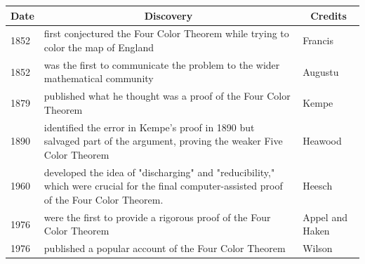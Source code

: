 \documentclass[11pt,a4paper,twoside]{book}
\begin{document}
\vspace{3.8cm}
\begin{table}[h]
	\centering
	\begin{tabular}{|p{2cm}|p{14cm}|p{2cm}|}
		\hline
		\multicolumn{1}{|c|}{Date} & \multicolumn{1}{c}{Discovery} & \multicolumn{1}{|c|}{Credits} \\
		\hline
		1852 &  first conjectured the Four Color Theorem while trying to color the map of England & Francis\\
		\hline
		1852 & was the first to communicate the problem to the wider mathematical community & Augustu \\
		\hline
		1879 & published what he thought was a proof of the Four Color Theorem  & Kempe \\
		\hline
		1890 & identified the error in Kempe's proof in 1890 but salvaged part of the argument, proving the weaker Five Color Theorem & Heawood \\
		\hline
		1960 & developed the idea of "discharging" and "reducibility," which were crucial for the final computer-assisted proof of the Four Color Theorem. & Heesch \\
		\hline
		1976 & were the first to provide a rigorous proof of the Four Color Theorem & Appel and Haken \\
		\hline
		1976 & published a popular account of the Four Color Theorem & Wilson \\
		\hline
	\end{tabular}
	
\end{table}
\end{document}
